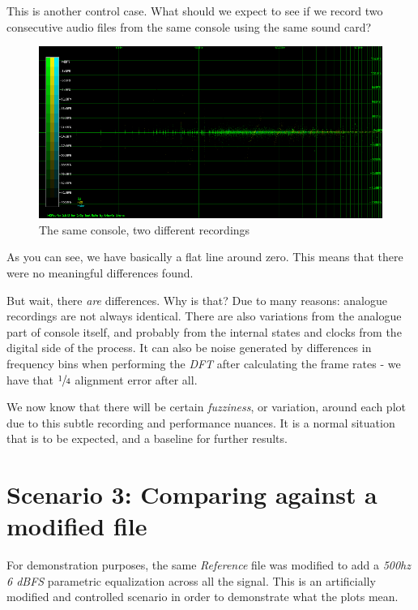 \documentclass[10pt,a4paper]{report}
\begin{document}
This is another control case. What should we expect to see if we record two consecutive audio files from the same console using the same sound card?

\begin{figure}[H]
	\centering
	\includegraphics[width=1\linewidth]{images/interpretation/Plot2-Sameconsole.png}
	\caption[Same console compared]{The same console, two different recordings}
	\label{fig:plot2-sameconsole}
\end{figure}

As you can see, we have basically a flat line around zero. This means that there were no meaningful differences found. 

But wait, there \textit{are} differences. Why is that? Due to many reasons: analogue recordings are not always identical. There are also variations from the analogue part of console itself, and probably from the internal states and clocks from the digital side of the process. It can also be noise generated by differences in frequency bins when performing the \textit{DFT} after calculating the frame rates - we have that $\sfrac{1}{4}$ alignment error after all.

We now know that there will be certain \textit{fuzziness}, or variation, around each plot due to this subtle recording and performance nuances. It is a normal situation that is to be expected, and a baseline for further results.

\section{Scenario 3: Comparing against a modified file}

For demonstration purposes, the same \textit{Reference} file was modified to add a \textit{500hz 6 dBFS} parametric equalization across all the signal. This is an artificially modified and controlled scenario in order to demonstrate what the plots mean.
\end{document}
